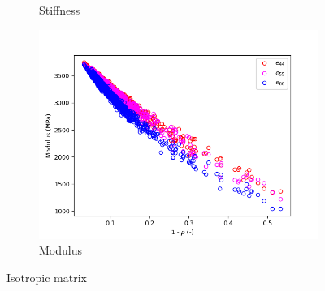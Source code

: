 \documentclass[a4paper,fleqn]{DC_ArtStyle}
\begin{document}
\begin{figure}
\begin{subfigure}[b]{0.45\linewidth}
			\caption{Stiffness}
		\end{subfigure}
		\begin{subfigure}[b]{0.45\linewidth}
			\includegraphics[width=\linewidth]{MuijModulus_Isotropic}
			\caption{Modulus}
		\end{subfigure}
		\caption{Isotropic matrix}
	\end{figure}
\end{document}
